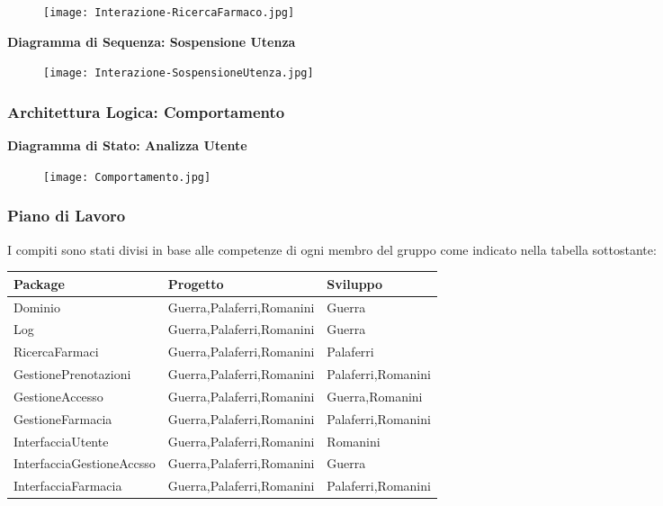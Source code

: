 \begin{figure}[h!]
    \begin{center}
        \texttt{[image: Interazione-RicercaFarmaco.jpg]}
    \end{center}
\end{figure}
\hfill \break

\textbf{Diagramma di Sequenza: Sospensione Utenza}

\begin{figure}[h!]
    \begin{center}
        \texttt{[image: Interazione-SospensioneUtenza.jpg]}
    \end{center}
\end{figure}
\hfill \break

\newpage
\subsubsection{Architettura Logica: Comportamento}
\hfill \break

\textbf{Diagramma di Stato: Analizza Utente}

\begin{figure}[h!]
    \begin{center}
        \texttt{[image: Comportamento.jpg]}
    \end{center}
\end{figure}
\hfill \break

\newpage
\subsubsection{Piano di Lavoro}

I compiti sono stati divisi in base alle competenze di 
ogni membro del gruppo come indicato nella tabella sottostante:\\

\begin{tabular} {|P{5cm}|P{5cm}|P{5cm}|} %
    \hline
    \textbf{Package} & \textbf{Progetto} & \textbf{Sviluppo} \\
    \hline
    Dominio  &  Guerra,Palaferri,Romanini  &  Guerra\\
    \hline
    Log  &  Guerra,Palaferri,Romanini & Guerra\\
    \hline
    RicercaFarmaci  &  Guerra,Palaferri,Romanini &  Palaferri \\
    \hline
    GestionePrenotazioni  & Guerra,Palaferri,Romanini & Palaferri,Romanini \\
    \hline
    GestioneAccesso  & Guerra,Palaferri,Romanini & Guerra,Romanini \\
    \hline
    GestioneFarmacia  & Guerra,Palaferri,Romanini & Palaferri,Romanini \\
    \hline
    InterfacciaUtente  & Guerra,Palaferri,Romanini & Romanini \\
    \hline
    InterfacciaGestioneAccsso  & Guerra,Palaferri,Romanini & Guerra\\
    \hline
    InterfacciaFarmacia  & Guerra,Palaferri,Romanini & Palaferri,Romanini \\
    \hline
\end{tabular}
\hfill \break

